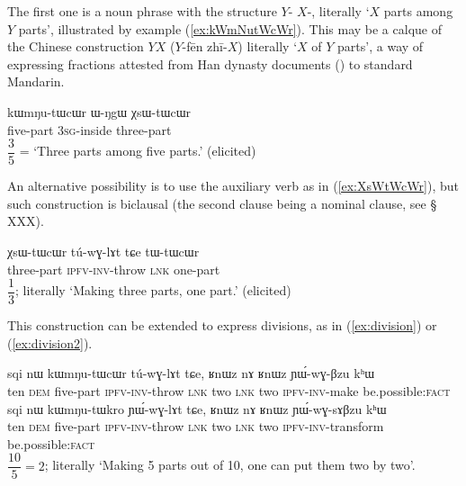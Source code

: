 The first one is a noun phrase with the structure $Y$-  $X$-, literally `$X$ parts among $Y$ parts', illustrated by example (\ref{ex:kWmNutWcWr}). This may be a calque of the Chinese construction $Y$$X$ 
($Y$-fēn zhī-$X$) literally `$X$ of $Y$ parts', a way of expressing fractions attested from Han dynasty documents (\citealt{anicotte15fractions}) to standard Mandarin.
 
\begin{exe}
\ex \label{ex:kWmNutWcWr}
 \gll kɯmŋu-tɯcɯr ɯ-ŋgɯ χsɯ-tɯcɯr  \\
 five-part \textsc{3sg}-inside three-part \\
 \glt $\dfrac{3}{5}$ = `Three parts among five parts.' (elicited)
\end{exe}

An alternative possibility is to use the auxiliary verb  as in (\ref{ex:XsWtWcWr}), but such construction is biclausal (the second clause being a nominal clause, see § XXX).

\begin{exe}
\ex \label{ex:XsWtWcWr}
 \gll χsɯ-tɯcɯr tú-wɣ-lɤt tɕe tɯ-tɯcɯr   \\
 three-part \textsc{ipfv}-\textsc{inv}-throw \textsc{lnk} one-part \\
 \glt $\dfrac{1}{3}$; literally `Making three parts, one part.' (elicited)
\end{exe}

This construction can be  extended to express divisions, as in (\ref{ex:division}) or (\ref{ex:division2}).

\begin{exe}
\ex \label{ex:division}
 \gll sqi nɯ kɯmŋu-tɯcɯr tú-wɣ-lɤt tɕe, ʁnɯz nɤ ʁnɯz ɲɯ́-wɣ-βzu kʰɯ \\
 ten \textsc{dem} five-part \textsc{ipfv}-\textsc{inv}-throw \textsc{lnk} two \textsc{lnk} two \textsc{ipfv}-\textsc{inv}-make be.possible:\textsc{fact} \\
 \ex \label{ex:division2}
 \gll sqi nɯ kɯmŋu-tɯkro ɲɯ́-wɣ-lɤt tɕe, ʁnɯz nɤ ʁnɯz ɲɯ́-wɣ-sɤβzu kʰɯ \\
 ten \textsc{dem} five-part \textsc{ipfv}-\textsc{inv}-throw \textsc{lnk} two \textsc{lnk} two \textsc{ipfv}-\textsc{inv}-transform be.possible:\textsc{fact} \\
 \glt $\dfrac{10}{5}=2$; literally `Making 5 parts out of 10, one can put them two by two'.
\end{exe}

 
